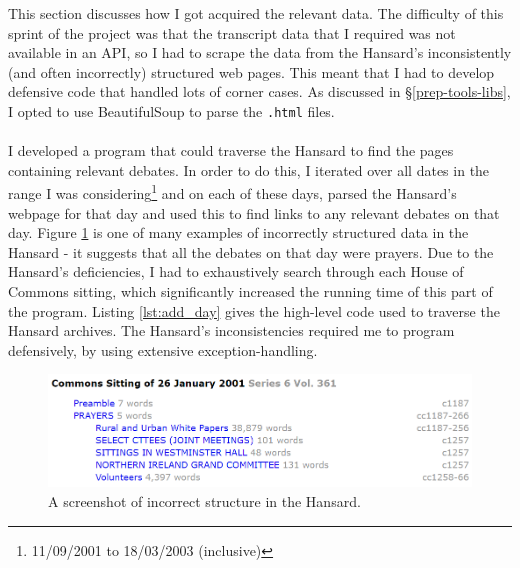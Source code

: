\documentclass[12pt,a4paper,twoside,openright]{report}
\newcommand{\mylisting}[4]{}
\newcommand{\pylisting}[2]{\mylisting{Python}{py}{#1}{#2}}
\begin{document}
This section discusses how I got acquired the relevant data. The difficulty of this sprint of the project was that the transcript data that I required was not available in an API, so I had to scrape the data from the Hansard's inconsistently (and often incorrectly) structured web pages. This meant that I had to develop defensive code that handled lots of corner cases. As discussed in \S\ref{prep-tools-libs}, I opted to use BeautifulSoup to parse the \texttt{.html} files.
\\\\
I developed a program that could traverse the Hansard to find the pages containing relevant debates. In order to do this, I iterated over all dates in the range I was considering\footnote{11/09/2001 to 18/03/2003 (inclusive)} and on each of these days, parsed the Hansard's webpage for that day and used this to find links to any relevant debates on that day. Figure \ref{fig:incorrecthansard} is one of many examples of incorrectly structured data in the Hansard - it suggests that all the debates on that day were prayers. Due to the Hansard's deficiencies, I had to exhaustively search through each House of Commons sitting, which significantly increased the running time of this part of the program. Listing \ref{lst:add_day} gives the high-level code used to traverse the Hansard archives. The Hansard's inconsistencies required me to program defensively, by using extensive exception-handling.
\newline

\begin{figure}
	\includegraphics[width=\linewidth]{figs/incorrecthansard.png}
	\caption{A screenshot of incorrect structure in the Hansard.}
	\label{fig:incorrecthansard}
\end{figure}

\pylisting{High-level code used to scrape all the debates from a given day.}{add_day}
\end{document}
